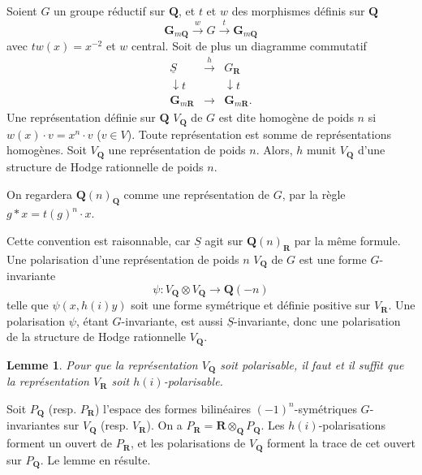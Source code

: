 \documentclass[11pt]{amsart}
\theoremstyle{plain}
\newtheorem{lemme}[theoreme]{Lemme}
\theoremstyle{definition}
\theoremstyle{remark}
\begin{document}
\subsection*{}
Soient $G$ un groupe r\'eductif sur $\mathbf{Q}$, et $t$ et $w$ des morphismes d\'efinis sur $\mathbf{Q}$
\begin{equation*}
\mathbf{G}_{m\mathbf{Q}}\xrightarrow{w}G\xrightarrow{t}\mathbf{G}_{m\mathbf{Q}}
\end{equation*}
avec $tw(x)=x^{-2}$ et $w$ central. Soit de plus un diagramme commutatif
\begin{equation*}
\begin{array}{ccc}
\underline{S} & \xrightarrow{h} & G_\mathbf{R} \\
\downarrow{t} & & \downarrow{t} \\
\mathbf{G}_{m\mathbf{R}} & \xrightarrow{\hspace{1em}} & \mathbf{G}_{m\mathbf{R}}.
\end{array}
\end{equation*}
Une repr\'esentation d\'efinie sur $\mathbf{Q}$ $V_\mathbf{Q}$ de $G$ est dite homog\`ene de poids $n$ si $w(x)\cdot v=x^n\cdot v$ ($v\in V$). Toute repr\'esentation est somme de repr\'esentations homog\`enes. Soit $V_\mathbf{Q}$ une repr\'esentation de poids $n$. Alors, $h$ munit $V_\mathbf{Q}$ d'une structure de Hodge rationnelle de poids $n$.

On regardera $\mathbf{Q}(n)_\mathbf{Q}$ comme une repr\'esentation de $G$, par la r\`egle $g*x=t(g)^n\cdot x$.

Cette convention est raisonnable, car $\underline{S}$ agit sur $\mathbf{Q}(n)_\mathbf{R}$ par la m\^eme formule. Une polarisation d'une repr\'esentation de poids $n$ $V_\mathbf{Q}$ de $G$ est une forme $G$-invariante
\begin{equation*}
\psi\colon V_\mathbf{Q}\otimes V_\mathbf{Q}\longrightarrow \mathbf{Q}(-n)
\end{equation*}
telle que $\psi(x,h(i)y)$ soit une forme sym\'etrique et d\'efinie positive sur $V_\mathbf{R}$. Une polarisation $\psi$, \'etant $G$-invariante, est aussi $\underline{S}$-invariante, donc une polarisation de la structure de Hodge rationnelle $V_\mathbf{Q}$.

\begin{lemme}
Pour que la repr\'esentation $V_\mathbf{Q}$ soit polarisable, il faut et il suffit que la repr\'esentation $V_\mathbf{R}$ soit $h(i)$-polarisable.
\end{lemme}

Soit $P_\mathbf{Q}$ (resp. $P_\mathbf{R}$) l'espace des formes bilin\'eaires $(-1)^n$-sym\'etriques $G$-invariantes sur $V_\mathbf{Q}$ (resp. $V_\mathbf{R}$). On a $P_\mathbf{R}=\mathbf{R}\otimes_\mathbf{Q}P_\mathbf{Q}$. Les $h(i)$-polarisations forment un ouvert de $P_\mathbf{R}$, et les polarisations de $V_\mathbf{Q}$ forment la trace de cet ouvert sur $P_\mathbf{Q}$. Le lemme en r\'esulte.
\end{document}

